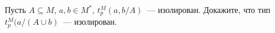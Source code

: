 Пусть $A \subseteq M$, $a, b \in M^{*}$, $t_p^M(a, b / A)$~--- изолирован. Докажите, что тип $t_p^M(a /
(A \cup {b})$~--- изолирован.